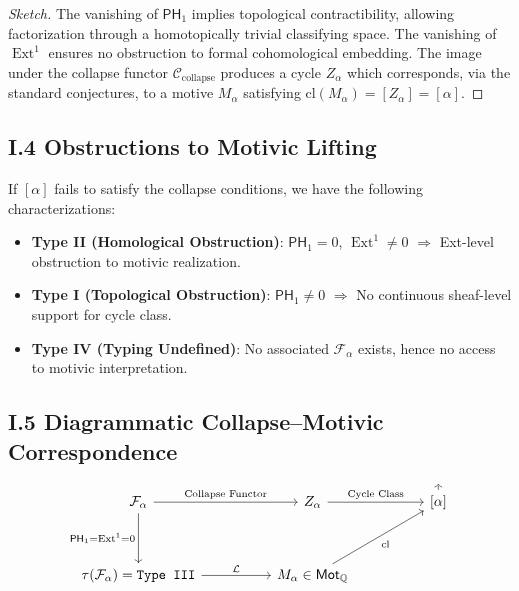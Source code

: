 \documentclass[11pt]{article}
\DeclareMathOperator{\Ext}{Ext}
\begin{document}
\begin{proof}[Sketch]
The vanishing of $\mathsf{PH}_1$ implies topological contractibility, allowing factorization through a homotopically trivial classifying space. The vanishing of $\Ext^1$ ensures no obstruction to formal cohomological embedding. The image under the collapse functor $\mathcal{C}_{\text{collapse}}$ produces a cycle $Z_\alpha$ which corresponds, via the standard conjectures, to a motive $M_\alpha$ satisfying $\mathrm{cl}(M_\alpha) = [Z_\alpha] = [\alpha]$.
\end{proof}

\subsection*{I.4 Obstructions to Motivic Lifting}

If $[\alpha]$ fails to satisfy the collapse conditions, we have the following characterizations:

\begin{itemize}
  \item \textbf{Type II (Homological Obstruction)}: $\mathsf{PH}_1 = 0$, $\Ext^1 \ne 0$ $\Rightarrow$ Ext-level obstruction to motivic realization.
  \item \textbf{Type I (Topological Obstruction)}: $\mathsf{PH}_1 \ne 0$ $\Rightarrow$ No continuous sheaf-level support for cycle class.
  \item \textbf{Type IV (Typing Undefined)}: No associated $\mathcal{F}_\alpha$ exists, hence no access to motivic interpretation.
\end{itemize}

\subsection*{I.5 Diagrammatic Collapse–Motivic Correspondence}

\[
\begin{tikzcd}[row sep=3.5em, column sep=5em]
\mathcal{F}_\alpha 
  \arrow[r, "{\text{Collapse Functor}}"] 
  \arrow[d, swap, "{\mathsf{PH}_1 = \Ext^1 = 0}"]
& Z_\alpha 
  \arrow[r, "{\text{Cycle Class}}"]
& {[\alpha]} 
  \arrow[dashed, bend left=20, to path={ -- ([yshift=1ex]\tikztotarget.north) \tikztonodes}]
\\
{\tau(\mathcal{F}_\alpha) = \texttt{Type III}} 
  \arrow[r, "\mathcal{L}"]
& {M_\alpha \in \mathsf{Mot}_{\mathbb{Q}}} 
  \arrow[ur, swap, "\mathrm{cl}"]
\end{tikzcd}
\]
\end{document}
